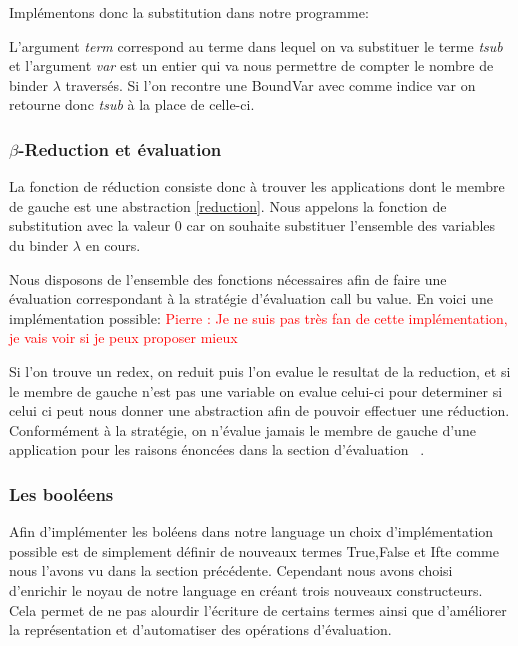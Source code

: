 \documentclass {article}
\newcommand{\codefrom}[3]
           {}
\theoremstyle{definition}
\theoremstyle{remark}
\newcommand{\todo}[1]{\textcolor{red}{#1}}
\begin{document}
Implémentons donc la substitution dans notre programme:

\codefrom{untyped}{lambda}{substitution}

L'argument \emph{term} correspond au terme dans lequel on va substituer le terme \emph{tsub} et 
l'argument \emph{var} est un entier qui va nous permettre de compter le nombre de binder \(\lambda\)
traversés. Si l'on recontre une BoundVar avec comme indice var on retourne donc \emph{tsub} à la 
place de celle-ci.


\subsubsection{$\beta$-Reduction et évaluation}
La fonction de réduction consiste donc à trouver les applications dont le membre 
de gauche est une abstraction \ref{reduction}.
Nous appelons la fonction de substitution  avec la
valeur \(0\) car on souhaite substituer l'ensemble des variables du binder
\(\lambda\) en cours.

\codefrom{untyped}{lambda}{reduction}

Nous disposons de l'ensemble des fonctions nécessaires afin de faire une évaluation 
correspondant à la stratégie d'évaluation call bu value. En voici une implémentation
possible: 
\todo{Pierre : Je ne suis pas très fan de cette implémentation, je vais voir si je peux proposer mieux}

\codefrom{untyped}{lambda}{evaluation}

Si l'on trouve un redex, on reduit puis l'on evalue le resultat de la reduction,
et si le membre de gauche n'est pas une variable on evalue celui-ci pour determiner
si celui ci peut nous donner une abstraction afin de pouvoir effectuer une réduction.
Conformément à la stratégie, on n'évalue jamais le membre de gauche d'une application
pour les raisons énoncées dans la section d'évaluation ~\citep{reduction:call_by_name}.


\subsubsection{Les booléens}

Afin d'implémenter les boléens dans notre language un choix d'implémentation 
possible est de simplement définir de nouveaux termes True,False et Ifte
comme nous l'avons vu dans la section précédente. Cependant nous avons choisi 
d'enrichir le noyau de notre language en créant trois nouveaux constructeurs.
Cela permet de ne pas alourdir l'écriture de certains termes ainsi que 
d'améliorer la représentation et d'automatiser des opérations d'évaluation.
\end{document}
